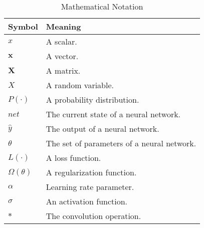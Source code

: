 \documentclass[../main.tex]{subfiles}
\begin{document}
    \begin{table}
    \centering
    \caption{Mathematical Notation}
    \begin{tabulary}{\textwidth}{| L | L |}
        \toprule
        Symbol              &    Meaning                                 \\
        \midrule
        $x$                 & A scalar.                                  \\
        $\boldsymbol{x}$    & A vector.                                  \\
        $\boldsymbol{X}$    & A matrix.                                  \\
        $X$                 & A random variable.                         \\
        $P(\cdot)$          & A probability distribution.                \\
        $net$               & The current state of a neural network.     \\
        $\hat{y}$           & The output of a neural network.            \\
        $\theta$            & The set of parameters of a neural network. \\
        $L(\cdot)$          & A loss function.                           \\
        $\Omega(\theta)$    & A regularization function.                 \\
        $\alpha$            & Learning rate parameter.                   \\
        $\sigma$            & An activation function.                    \\
        $*$                 & The convolution operation.                 \\
        \bottomrule
    \end{tabulary}
    \end{table}
\end{document}
